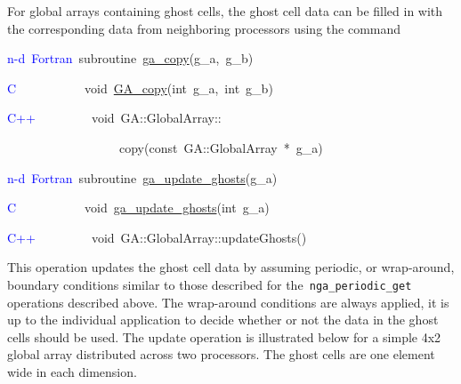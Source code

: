 For global arrays containing ghost cells, the ghost cell data can
be filled in with the corresponding data from neighboring processors
using the command
\begin{lyxcode}
\textcolor{blue}{n-d~Fortran}~subroutine~\href{http://www.emsl.pnl.gov/docs/global/ga_ops.html\#ga_copy}{ga\_{}copy}(g\_a,~g\_b)~

\textcolor{blue}{C~}~~~~~~~~~~void~\href{http://www.emsl.pnl.gov/docs/global/c_nga_ops.html\#ga_copy}{GA\_{}copy}(int~g\_a,~int~g\_b)~

\textcolor{blue}{C++}~~~~~~~~~void~GA::GlobalArray::

~~~~~~~~~~~~~~~~~~copy(const~GA::GlobalArray~{*}~g\_a)



\textcolor{blue}{n-d~Fortran}~subroutine~\href{http://www.emsl.pnl.gov/docs/global/ga_ops.html\#ga_update_ghosts}{ga\_{}update\_{}ghosts}(g\_a)~

\textcolor{blue}{C}~~~~~~~~~~~void~\href{http://www.emsl.pnl.gov/docs/global/c_nga_ops.html\#ga_update_ghosts}{ga\_{}update\_{}ghosts}(int~g\_a)~

\textcolor{blue}{C++}~~~~~~~~~void~GA::GlobalArray::updateGhosts()~
\end{lyxcode}
This operation updates the ghost cell data by assuming periodic, or
wrap-around, boundary conditions similar to those described for the\texttt{
nga\_periodic\_get} operations described above. The wrap-around conditions
are always applied, it is up to the individual application to decide
whether or not the data in the ghost cells should be used. The update
operation is illustrated below for a simple 4x2 global array distributed
across two processors. The ghost cells are one element wide in each
dimension.

